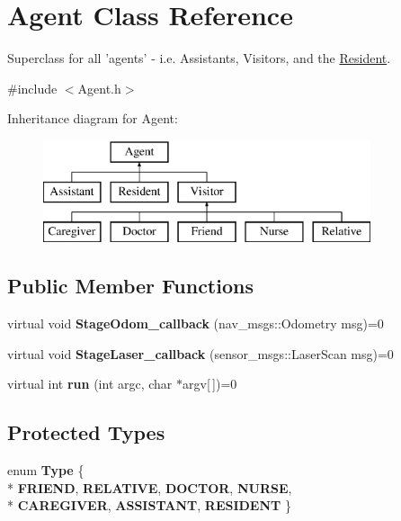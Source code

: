\hypertarget{classAgent}{\section{Agent Class Reference}
\label{classAgent}
}


Superclass for all 'agents' -\/ i.\-e. Assistants, Visitors, and the \hyperlink{classResident}{Resident}.  




{\ttfamily \#include $<$Agent.\-h$>$}

Inheritance diagram for Agent\-:\begin{figure}[H]
\begin{center}
\leavevmode
\includegraphics[height=3.000000cm]{classAgent}
\end{center}
\end{figure}
\subsection*{Public Member Functions}
\begin{DoxyCompactItemize}
\item 
\hypertarget{classAgent_a4b1182b9ee5dccaa871d71beef94a7d2}{virtual void {\bfseries Stage\-Odom\-\_\-callback} (nav\-\_\-msgs\-::\-Odometry msg)=0}\label{classAgent_a4b1182b9ee5dccaa871d71beef94a7d2}

\item 
\hypertarget{classAgent_adfe1de8bbeaa7e4a5f7f2ff3e45593e8}{virtual void {\bfseries Stage\-Laser\-\_\-callback} (sensor\-\_\-msgs\-::\-Laser\-Scan msg)=0}\label{classAgent_adfe1de8bbeaa7e4a5f7f2ff3e45593e8}

\item 
\hypertarget{classAgent_a3de32bf3de5baf5a996b874f2ba7cf75}{virtual int {\bfseries run} (int argc, char $\ast$argv\mbox{[}$\,$\mbox{]})=0}\label{classAgent_a3de32bf3de5baf5a996b874f2ba7cf75}

\end{DoxyCompactItemize}
\subsection*{Protected Types}
\begin{DoxyCompactItemize}
\item 
enum {\bfseries Type} \{ \\*
{\bfseries F\-R\-I\-E\-N\-D}, 
{\bfseries R\-E\-L\-A\-T\-I\-V\-E}, 
{\bfseries D\-O\-C\-T\-O\-R}, 
{\bfseries N\-U\-R\-S\-E}, 
\\*
{\bfseries C\-A\-R\-E\-G\-I\-V\-E\-R}, 
{\bfseries A\-S\-S\-I\-S\-T\-A\-N\-T}, 
{\bfseries R\-E\-S\-I\-D\-E\-N\-T}
 \}
\end{DoxyCompactItemize}
